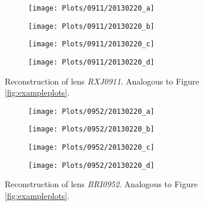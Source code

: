 \documentclass[10pt]{article}
\begin{document}
\begin{figure}[ht!]
 \centering
 \begin{subfigure}{.48\textwidth}
  \centering
  \texttt{[image: Plots/0911/20130220\_a]}
  \caption{}
 \end{subfigure}
 \begin{subfigure}{.48\textwidth}
  \centering
  \texttt{[image: Plots/0911/20130220\_b]}
  \caption{}
 \end{subfigure}
 
 \begin{subfigure}{.48\textwidth}
  \centering
  \texttt{[image: Plots/0911/20130220\_c]}
  \caption{}
 \end{subfigure}
 \begin{subfigure}{.48\textwidth}
  \centering
  \texttt{[image: Plots/0911/20130220\_d]}
  \caption{}
 \end{subfigure}
 \captionsetup{width=.93\textwidth}
 \caption{Reconstruction of lens \textit{RXJ0911}. Analogous to Figure \ref{fig:exampleplots}.}
 \label{fig:911}
\end{figure}

\begin{figure}[ht!]
 \centering
 \begin{subfigure}{.48\textwidth}
  \centering
  \texttt{[image: Plots/0952/20130220\_a]}
  \caption{}
 \end{subfigure}
 \begin{subfigure}{.48\textwidth}
  \centering
  \texttt{[image: Plots/0952/20130220\_b]}
  \caption{}
 \end{subfigure}
 
 \begin{subfigure}{.48\textwidth}
  \centering
  \texttt{[image: Plots/0952/20130220\_c]}
  \caption{}
 \end{subfigure}
 \begin{subfigure}{.48\textwidth}
  \centering
  \texttt{[image: Plots/0952/20130220\_d]}
  \caption{}
 \end{subfigure}
 \captionsetup{width=.93\textwidth}
 \caption{Reconstruction of lens \textit{BRI0952}. Analogous to Figure \ref{fig:exampleplots}.}
 \label{fig:952}
\end{figure}
\end{document}
